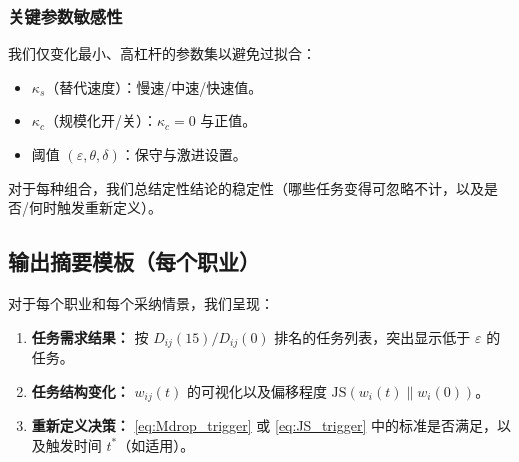 \subsubsection{关键参数敏感性}
\label{sec:param_sens}
我们仅变化最小、高杠杆的参数集以避免过拟合：
\begin{itemize}
  \item $\kappa_s$（替代速度）：慢速/中速/快速值。
  \item $\kappa_c$（规模化开/关）：$\kappa_c=0$ 与正值。
  \item 阈值 $(\varepsilon,\theta,\delta)$：保守与激进设置。
\end{itemize}
对于每种组合，我们总结定性结论的稳定性（哪些任务变得可忽略不计，以及是否/何时触发重新定义）。

\subsection{输出摘要模板（每个职业）}
\label{sec:output_template}
对于每个职业和每个采纳情景，我们呈现：
\begin{enumerate}
  \item \textbf{任务需求结果：} 按 $D_{ij}(15)/D_{ij}(0)$ 排名的任务列表，突出显示低于 $\varepsilon$ 的任务。
  \item \textbf{任务结构变化：} $w_{ij}(t)$ 的可视化以及偏移程度 $\mathrm{JS}(w_i(t)\|w_i(0))$。
  \item \textbf{重新定义决策：} \eqref{eq:Mdrop_trigger} 或 \eqref{eq:JS_trigger} 中的标准是否满足，以及触发时间 $t^*$（如适用）。
\end{enumerate}

